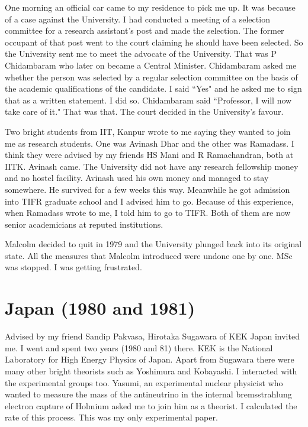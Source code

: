 One morning an official car came to my residence to pick me up. It was 
because of a case against the University. I had condu\-cted a meeting of a 
selection committee for a research assistant's post and made the 
selection. The former occupant of that post went to the court claiming 
he should have been selected. So the University sent me to meet the 
advocate of the University. That was P Chidambaram who later on became a 
Central Minister. Chidambaram asked me whether the person was selected 
by a regular selection committee on the basis of the academic 
qualifications of the candidate. I said ``Yes" and he asked me to sign 
that as a written statement. I did so. Chidambaram said ``Professor, I 
will now take care of it." That was that. The court decided in the 
University's favour.

Two bright students from IIT, Kanpur wrote to me saying they wanted to 
join me as research students. One was Avinash Dhar and the other was 
Ramadass. I think they were advised by my friends HS Mani and R 
Ramachandran, both at IITK. Avinash came. The University did not have 
any research fellowship money and no hostel facility. Avinash used his 
own money and managed to stay somewhere. He survived for a few weeks 
this way. Meanwhile he got admission into TIFR graduate school and I 
advised him to go. Because of this experience, when Ramadass wrote to 
me, I told him to go to TIFR. Both of them are now senior academicians 
at reputed institutions.

Malcolm decided to quit in 1979 and the University plunged back into its 
original state. All the measures that Malcolm introduced were undone one 
by one. MSc was stopped. I was getting frustrated.

\section*{Japan (1980 and 1981)}

Advised by my friend Sandip Pakvasa, Hirotaka Sugawara of KEK Japan 
invited me. I went and spent two years (1980 and 81) there. KEK is the 
National Laboratory for High Energy Physics of Japan. Apart from 
Sugawara there were many other bright theorists such as Yoshimura and 
Kobayashi. I interacted with the experimental groups too. Yasumi, an 
experimental nuclear physicist who wanted to measure the mass of the 
antineutrino in the internal bremsstrahlung electron capture of Holmium 
asked me to join him as a theorist. I calculated the rate of this 
process. This was my only experimental paper.


